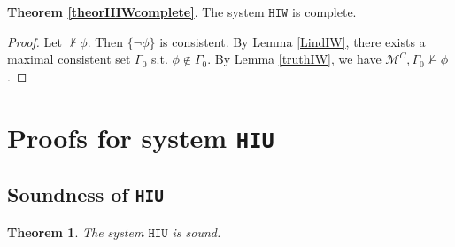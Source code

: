 \documentclass{article}
\newtheorem{theor}{Theorem}
\begin{document}
\textbf{Theorem \ref{theorHIWcomplete}}. The system $\mathtt{HIW}$ is complete.



\begin{proof}

Let $\not \vdash \phi$. Then $\{\neg \phi\}$ is consistent. By Lemma \ref{LindIW}, there exists a maximal consistent set $\Gamma_{0}$ s.t. $\phi \not \in \Gamma_{0}$. By Lemma \ref{truthIW}, we have $\mathcal{M}^{C}, \Gamma_{0} \not \models \phi$.

\end{proof}


\section{Proofs for system \texttt{HIU}}

\subsection{Soundness of \texttt{HIU}}
\label{appHIUsound}

\begin{theor}

The system $\mathtt{HIU}$ is sound.

\end{theor}
\end{document}
